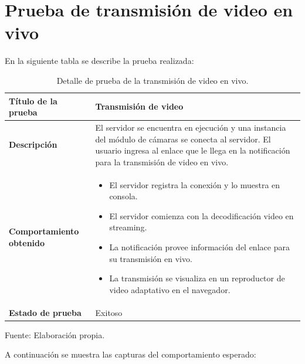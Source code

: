 \section{Prueba de transmisión de video en vivo}

En la siguiente tabla se describe la prueba realizada:\\

\begin{table}[H]
    \caption{Detalle de prueba de la transmisión de video en vivo.}
    \begin{center}
        \begin{tabular}{|>{\centering}p{}|m{}<{\centering}|} 
            \hline
            \textbf{Título de la prueba} & Transmisión de video\\
            \hline
            \textbf{Descripción} & El servidor se encuentra en ejecución y una instancia del módulo de cámaras se conecta al servidor. El usuario ingresa al enlace que le llega en la notificación para la transmisión de video en vivo.\\
            \hline
            \textbf{Comportamiento obtenido} & 
            \begin{itemize}
                \item El servidor registra la conexión y lo muestra en consola.
                \item El servidor comienza con la decodificación video en streaming.
                \item La notificación provee información del enlace para su transmisión en vivo.
                \item La transmisión se visualiza en un reproductor de video adaptativo en el navegador.
            \end{itemize} \\ 
            \hline
            \textbf{Estado de prueba} & Exitoso \\
            \hline
        \end{tabular}
    \end{center}
    \begin{center}
        Fuente: Elaboración propia.
    \end{center}
\end{table}

A continuación se muestra las capturas del comportamiento esperado:\\

